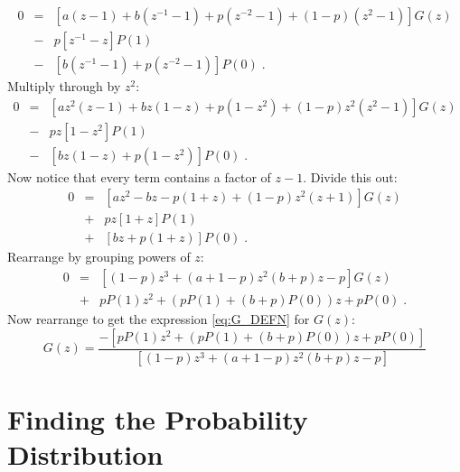 \documentclass[a4paper,10pt]{article}
\begin{document}
\begin{eqnarray}
  0 & = & \left[ a (z - 1 ) + b (z^{-1} - 1 ) + p (z^{-2} - 1 ) + (1-p) ( z^2 - 1) \right] G(z) \nonumber \\
    & - & p \left[ z^{-1} - z \right] P(1) \nonumber \\
    & - & \left[ b(z^{-1} - 1 ) + p ( z^{-2} - 1) \right] P(0) \;.
\end{eqnarray}
Multiply through by $z^2$:
\begin{eqnarray}
  0 & = & \left[ a z^2(z - 1 ) + b z(1 - z ) + p (1 - z^2 ) + (1-p) z^2( z^2 - 1) \right] G(z) \nonumber \\
    & - & p z\left[ 1 - z^2 \right] P(1) \nonumber \\
    & - & \left[ bz(1 - z ) + p ( 1 - z^2) \right] P(0) \;.
\end{eqnarray}
Now notice that every term contains a factor of $z-1$. Divide this out:
\begin{eqnarray}
  0 & = & \left[ a z^2 - b z - p (1 + z ) + (1-p) z^2( z + 1 ) \right] G(z) \nonumber \\
    & + & p z\left[ 1 + z \right] P(1) \nonumber \\
    & + & \left[ bz + p (1+z) \right] P(0) \;.
\end{eqnarray}
Rearrange by grouping powers of $z$:
\begin{eqnarray}
  0 & = & \left[ (1-p)z^3 +(a + 1 -p) z^2 (b+p)z -p \right] G(z) \nonumber \\
    & + & p P(1) z^2 + (pP(1) + (b+p)P(0))z + pP(0)  \;. 
\end{eqnarray}
Now rearrange to get the expression \eqref{eq:G_DEFN} for $G(z)$:
\begin{equation}
  G(z) = \frac{
	       - \left[ p P(1) z^2 + (pP(1) + (b+p)P(0))z + pP(0) \right] 
              }
              {
               \left[ (1-p)z^3 +(a + 1 -p) z^2 (b+p)z -p \right]
              }
\end{equation}

\section{Finding the Probability Distribution}
\end{document}
